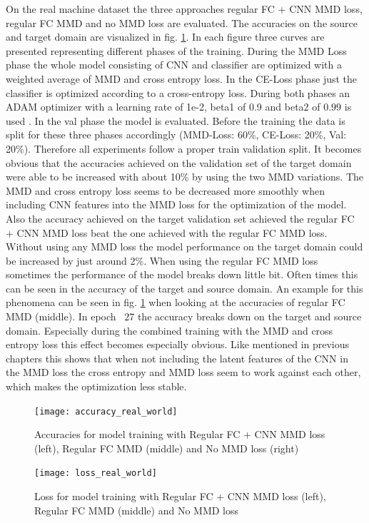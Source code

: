 On the real machine dataset the three approaches regular FC + CNN MMD loss,  regular FC MMD and no MMD loss are evaluated. The accuracies on the source and target domain are visualized in fig. \ref{fig:accuracy_real_world}. In each figure three curves are presented representing different phases of the training. During the MMD Loss phase the whole model consisting of CNN and classifier are optimized with a weighted average of MMD and cross entropy loss. In the CE-Loss phase just the classifier is optimized according to a cross-entropy loss. During both phases an ADAM optimizer with a learning rate of 1e-2, beta1 of 0.9 and beta2 of 0.99 is used . In the val phase the model is evaluated. Before the training the data is split for these three phases accordingly (MMD-Loss: 60\%, CE-Loss: 20\%, Val: 20\%). Therefore all experiments follow a proper train validation split. It becomes obvious that the accuracies achieved on the validation set of the target domain were able to be increased with about 10\% by using the two MMD variations. The MMD and cross entropy loss seems to be decreased more smoothly when including CNN features into the MMD loss for the optimization of the model. Also the accuracy achieved on the target validation set achieved the regular FC + CNN MMD loss beat the one achieved with the regular FC MMD loss. Without using any MMD loss the model performance on the target domain could be increased by just around 2\%. When using the regular FC MMD loss sometimes the performance of the model breaks down  little bit. Often times this can be seen in the accuracy of the target and source domain. An example for this phenomena can be seen in fig. \ref{fig:accuracy_real_world} when looking at the accuracies of regular FC MMD (middle). In epoch ~27 the accuracy breaks down on the target and source domain. Especially during the combined training with the MMD and cross entropy loss this effect becomes especially obvious. Like mentioned in previous chapters this shows that when not including the latent features of the CNN in the MMD loss the cross entropy and MMD loss seem to work against each other, which makes the optimization less stable.

\begin{figure}[htpb]
  \centering
  \texttt{[image: accuracy\_real\_world]}
  \caption {Accuracies for model training with Regular FC + CNN MMD loss (left), Regular FC MMD (middle) and No MMD loss (right)} \label{fig:accuracy_real_world}
\end{figure}

\begin{figure}[htpb]
  \centering
  \texttt{[image: loss\_real\_world]}
  \caption {Loss for model training with Regular FC + CNN MMD loss (left), Regular FC MMD (middle) and No MMD loss} \label{fig:loss_real_world}
\end{figure}


